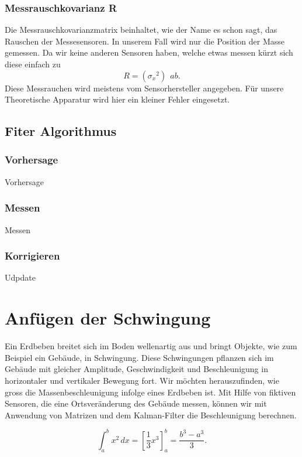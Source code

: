 \documentclass[11pt,a4paper]{article}
\begin{document}
\subsubsection*{Messrauschkovarianz R}
Die Messrauschkovarianzmatrix beinhaltet, wie der Name es schon sagt, das Rauschen der Messesensoren. In unserem Fall wird nur die Position der Masse gemessen. Da wir keine anderen Sensoren haben, welche etwas messen kürzt sich diese einfach zu
\begin{equation}
R= ({\sigma_x }^2)\: \: ab.
\end{equation} 
Diese Messrauchen wird meistens vom Sensorhersteller angegeben. Für unsere Theoretische Apparatur wird hier ein kleiner Fehler eingesetzt.

\subsection{Fiter Algorithmus}
\subsubsection*{Vorhersage}
Vorhersage 

\subsubsection*{Messen}
Messen
\subsubsection*{Korrigieren}
Udpdate
\section{Anfügen der Schwingung}

Ein Erdbeben breitet sich im Boden wellenartig aus und bringt Objekte, wie zum Beispiel ein Gebäude, in Schwingung.
Diese Schwingungen pflanzen sich im Gebäude mit gleicher Amplitude, Geschwindigkeit und Beschleunigung in horizontaler und vertikaler Bewegung fort.
Wir möchten herauszufinden, wie gross die Massenbeschleunigung infolge eines Erdbeben ist.
Mit Hilfe von fiktiven Sensoren, die eine Ortsveränderung des Gebäude messen, können wir mit Anwendung von Matrizen und dem Kalman-Filter die Beschleunigung berechnen.

\begin{equation}
\int_a^b x^2\, dx
=
\left[ \frac13 x^3 \right]_a^b
=
\frac{b^3-a^3}3.
\label{erdbeben:equation1}
\end{equation}
\end{document}
